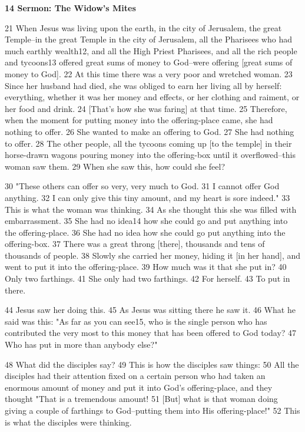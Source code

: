 
\textbf{14 Sermon: The Widow's Mites}

21 When Jesus was living upon the earth, in the city of Jerusalem, the great Temple--in
the great Temple in the city of Jerusalem, all the Pharisees who had much earthly
wealth12, and all the High Priest Pharisees, and all the rich people and tycoons13
offered great sums of money to God--were offering [great sums of money to God].
22 At this time there was a very poor and wretched woman. 23 Since her husband
had died, she was obliged to earn her living all by herself: everything, whether
it was her money and effects, or her clothing and raiment, or her food and drink.
24 [That's how she was faring] at that time. 25 Therefore, when the moment for
putting money into the offering-place came, she had nothing to offer. 26 She wanted
to make an offering to God. 27 She had nothing to offer. 28 The other people, all
the tycoons coming up [to the temple] in their horse-drawn wagons pouring money
into the offering-box until it overflowed--this woman saw them. 29 When she saw
this, how could she feel?

30 "These others can offer so very, very much to God. 31 I cannot offer
God anything. 32 I can only give this tiny amount, and my heart is sore indeed."
33 This is what the woman was thinking. 34 As she thought this she was filled with
embarrassment. 35 She had no idea14 how she could go and put anything into the
offering-place. 36 She had no idea how she could go put anything into the offering-box.
37 There was a great throng [there], thousands and tens of thousands of people.
38 Slowly she carried her money, hiding it [in her hand], and went to put it into
the offering-place. 39 How much was it that she put in? 40 Only two farthings.
41 She only had two farthings. 42 For herself. 43 To put in there.

44 Jesus saw her doing this. 45 As Jesus was sitting there he saw it. 46 What he
said was this: "As far as you can see15, who is the single person who
has contributed the very most to this money that has been offered to God today?
47 Who has put in more than anybody else?"

48 What did the disciples say? 49 This is how the disciples saw things: 50 All
the disciples had their attention fixed on a certain person who had taken an enormous
amount of money and put it into God's offering-place, and they thought "That
is a tremendous amount! 51 [But] what is that woman doing giving a couple of farthings
to God--putting them into His offering-place!" 52 This is what the disciples
were thinking.

